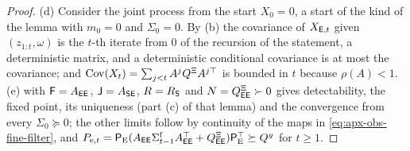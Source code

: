 \begin{proof}
(d) Consider the joint process from the start $X_0=0$, a start of the kind of the lemma with $m_0=0$ and $\Sigma_0=0$. By (b) the covariance of $X_{\mathsf{E},t}$ given $(z_{1:t},\omega)$ is the $t$-th iterate from $0$ of the recursion of the statement, a deterministic matrix, and a deterministic conditional covariance is at most the covariance; and $\operatorname{Cov}(X_t)=\sum_{j<t}A^jQ^{\Xi}A^{j\top}$ is bounded in $t$ because $\rho(A)<1$. (e) with $\mathsf F=A_{\mathsf{E}\mathsf{E}}$, $\mathsf J=A_{\mathsf{S}\mathsf{E}}$, $R=R_{\mathsf{S}}$ and $N=Q^{\Xi}_{\mathsf{E}\mathsf{E}}\succ0$ gives detectability, the fixed point, its uniqueness (part (c) of that lemma) and the convergence from every $\Sigma_0\succeq0$; the other limits follow by continuity of the maps in \eqref{eq:apx-obs-fine-filter}, and $P_{\mathrm e,t}=\mathsf P_{\mathrm E}(A_{\mathsf{E}\mathsf{E}}\Sigma^{\mathrm f}_{t-1}A_{\mathsf{E}\mathsf{E}}^\top+Q^{\Xi}_{\mathsf{E}\mathsf{E}})\mathsf P_{\mathrm E}^\top\succeq Q^y$ for $t\ge1$.
\end{proof}

